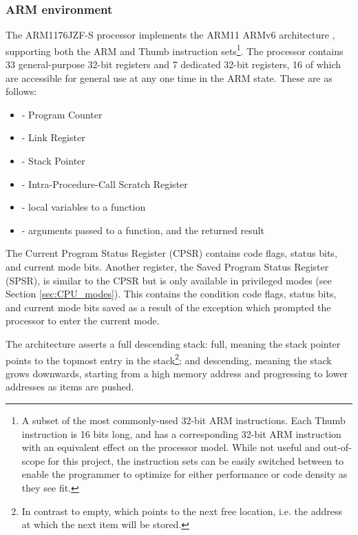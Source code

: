     \subsubsection{ARM environment}
        \label{sec:ARMenv}
        The ARM1176JZF-S processor implements the ARM11 ARMv6 architecture
        \cite{TRM}, supporting both the ARM and Thumb instruction sets\footnote{A
        subset of the most commonly-used 32-bit ARM instructions.  Each Thumb
        instruction is 16 bits long, and has a corresponding 32-bit ARM
        instruction with an equivalent effect on the processor model. While not
        useful and out-of-scope for this project, the instruction sets can be
        easily switched between to enable the programmer to optimize for either
        performance or code density as they see fit.}. The processor contains 33
        general-purpose 32-bit registers and 7 dedicated 32-bit registers, 16 of
        which are accessible for general use at any one time in the ARM state.
        These are as follows:
        \begin{itemize}
            \itemsep0em
            \item {} - Program Counter
            \item {} - Link Register
            \item {} - Stack Pointer
            \item {} - Intra-Procedure-Call Scratch Register
            \item {} - local variables to a function
            \item {} - arguments passed to a function, and the returned
                result
        \end{itemize}

        The Current Program Status Register (CPSR) contains code flags, status
        bits, and current mode bits.  Another register, the Saved Program Status
        Register (SPSR), is similar to the CPSR but is only available in
        privileged modes (see Section \ref{sec:CPU_modes}). This contains the
        condition code flags, status bits, and current mode bits saved as a
        result of the exception which prompted the processor to enter the
        current mode.

        The architecture asserts a full descending stack: full, meaning the
        stack pointer points to the topmost entry in the
        stack\footnote{In contrast to empty, which points to the next free
        location, i.e. the address at which the next item will be stored.}; and
        descending, meaning the stack grows downwards, starting from a high
        memory address and progressing to lower addresses as items are pushed.

